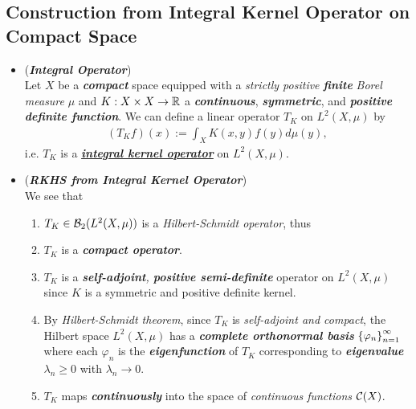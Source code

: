 \documentclass[11pt]{article}
\begin{document}
\subsection{Construction from Integral Kernel Operator on Compact Space}
\begin{itemize}
\item \begin{remark}(\emph{\textbf{Integral Operator}})\\
Let $X$ be a \emph{\textbf{compact}} space equipped with a \emph{strictly positive \textbf{finite}} \emph{Borel measure} $\mu$ and $K: X\times X \rightarrow {\mathbb R}$ a \emph{\textbf{continuous}}, \emph{\textbf{symmetric}}, and \emph{\textbf{positive definite function}}. We can define a linear operator $T_K$ on $L^2(X, \mu)$ by
\begin{align*}
(T_{K}f)(x) := \int_{X} K(x, y)f(y) d\mu(y),
\end{align*} i.e. $T_K$ is a \underline{\emph{\textbf{integral kernel operator}}} on $L^2(X, \mu)$. 
\end{remark}

\item \begin{remark} (\emph{\textbf{RKHS from Integral Kernel Operator}})\\
We see that 
\begin{enumerate}
\item $T_K \in {\mathcal B}_2(L^2(X, \mu))$ is a \emph{Hilbert-Schmidt operator}, thus
\item $T_K$ is a \emph{\textbf{compact operator}}.
\item $T_K$ is a  \emph{\textbf{self-adjoint}, \textbf{positive semi-definite}} operator on $L^2(X, \mu)$ since $K$ is a symmetric and positive definite kernel.
\item By \emph{Hilbert-Schmidt theorem}, since $T_K$ is \emph{self-adjoint and compact}, the Hilbert space $L^2(X, \mu)$ has a \emph{\textbf{complete orthonormal basis}} $\left\{\varphi_n\right\}_{n=1}^{\infty}$ where each $\varphi_n$ is the \textbf{\emph{eigenfunction}} of $T_K$ corresponding to \emph{\textbf{eigenvalue}} $\lambda_n \ge 0$ with $\lambda_n \rightarrow 0$.

\item $T_K$  maps \emph{\textbf{continuously}} into the space of \emph{continuous functions} ${\mathcal C}(X)$. 


\end{enumerate}
\end{remark}
\end{itemize}
\end{document}
